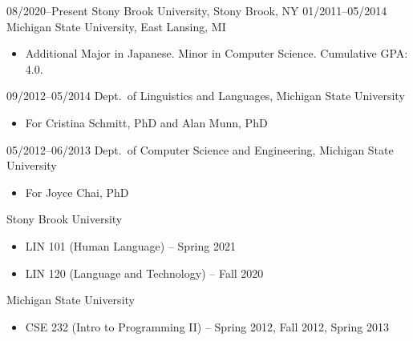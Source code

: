 \documentclass[10pt,oneside]{article}
\begin{document}
\topheading


\begin{reslist}
		{08/2020--Present}
		{Stony Brook University, Stony Brook, NY}
		{}
		{01/2011--05/2014}
		{Michigan State University, East Lansing, MI}
		{}
	\begin{itemize}
		\item Additional Major in Japanese. Minor in Computer Science. Cumulative GPA: 4.0.
	\end{itemize}
	
\end{reslist}




\begin{reslist}
		{09/2012--05/2014}
		{Dept.\ of Linguistics and Languages, Michigan State University}
		{}
	\begin{itemize}
		\item For Cristina Schmitt, PhD and Alan Munn, PhD%
	\end{itemize}
	
		{05/2012--06/2013}
		{Dept.\ of Computer Science and Engineering, Michigan State University}
		{}
	\begin{itemize}
		\item For Joyce Chai, PhD%
	\end{itemize}
\end{reslist}


\begin{reslist}
		{Stony Brook University}{}
	\begin{itemize}
		\item LIN 101 (Human Language) -- Spring 2021
		\item LIN 120 (Language and Technology) -- Fall 2020
	\end{itemize}
	
		{Michigan State University}{}
	\begin{itemize}
		\item CSE 232 (Intro to Programming II) -- Spring 2012, Fall 2012, Spring 2013
	\end{itemize}
\end{reslist}
\end{document}
